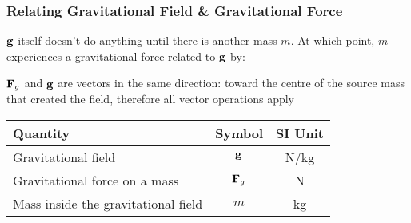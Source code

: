 \documentclass[12pt,compress,aspectratio=169]{beamer}
\newcommand{\mb}[1]{\ensuremath\mathbf{#1}}
\begin{document}
\begin{frame}
  \frametitle{Relating Gravitational Field \& Gravitational Force}

  $\mb{g}$ itself doesn't do anything until there is another mass $m$. At which
  point, $m$ experiences a gravitational force  related to $\mb{g}$ by:

  \vspace{-0.2in}{\Large
    \begin{displaymath}
      \boxed{\mb{g}=\frac{\mb{F}_g}{m}}
    \end{displaymath}
  }
  
  $\mb{F}_g$ and  $\mb{g}$ are vectors in the same direction: toward the
  centre of the source mass that created the field, therefore all vector
  operations apply

  \begin{center}
    \begin{tabular}{l|c|c}
      \rowcolor{pink}
      \textbf{Quantity} & \textbf{Symbol} & \textbf{SI Unit} \\ \hline
      Gravitational field & $\mb{g}$   & \si{N/kg}\\
      Gravitational force on a mass & $\mb{F}_g$ & \si{N} \\
      Mass inside the gravitational field & $m$ & \si{kg} \\
    \end{tabular}
  \end{center}
\end{frame}
\end{document}
